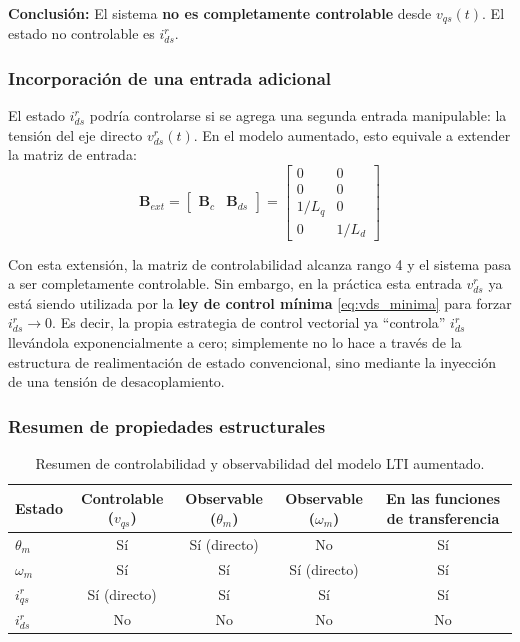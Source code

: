 \documentclass[12pt, a4paper,journal, onecolumn, compsoc]{IEEEtran}
\begin{document}
\textbf{Conclusión:} El sistema \textbf{no es completamente controlable} desde $v_{qs}(t)$. El estado no controlable es $i_{ds}^r$.

\subsubsection{Incorporación de una entrada adicional}
El estado $i_{ds}^r$ podría controlarse si se agrega una segunda entrada manipulable: la tensión del eje directo $v_{ds}^r(t)$. En el modelo aumentado, esto equivale a extender la matriz de entrada:
\begin{equation}
    \mathbf{B}_{ext} = \begin{bmatrix} \mathbf{B}_c & \mathbf{B}_{ds} \end{bmatrix} =
    \begin{bmatrix}
    0 & 0 \\ 0 & 0 \\ 1/L_q & 0 \\ 0 & 1/L_d
    \end{bmatrix}
\end{equation}

Con esta extensión, la matriz de controlabilidad alcanza rango 4 y el sistema pasa a ser completamente controlable. Sin embargo, en la práctica esta entrada $v_{ds}^r$ ya está siendo utilizada por la \textbf{ley de control mínima} \eqref{eq:vds_minima} para forzar $i_{ds}^r \to 0$. Es decir, la propia estrategia de control vectorial ya ``controla'' $i_{ds}^r$ llevándola exponencialmente a cero; simplemente no lo hace a través de la estructura de realimentación de estado convencional, sino mediante la inyección de una tensión de desacoplamiento.

\subsubsection{Resumen de propiedades estructurales}

\begin{table}[H]
\centering
\caption{Resumen de controlabilidad y observabilidad del modelo LTI aumentado.}
\label{tab:ctrl_obs}
\renewcommand{\arraystretch}{1.3}
\begin{tabular}{|l|c|c|c|c|}
\hline
\textbf{Estado} & \textbf{Controlable} ($v_{qs}$) & \textbf{Observable} ($\theta_m$) & \textbf{Observable} ($\omega_m$) & \textbf{En las funciones de transferencia} \\
\hline
$\theta_m$   & Sí & Sí (directo) & No & Sí \\
$\omega_m$   & Sí & Sí           & Sí (directo) & Sí \\
$i_{qs}^r$     & Sí (directo) & Sí      & Sí & Sí \\
$i_{ds}^r$   & No & No            & No & No \\
\hline
\end{tabular}
\end{table}
\end{document}
